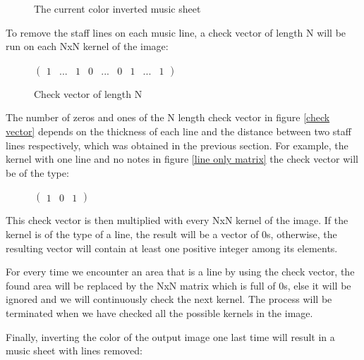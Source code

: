 \documentclass[final]{cvpr}
\begin{document}
\begin{figure}[h]
    \caption{The current color inverted music sheet}
    \label{}
\end{figure}
 
To remove the staff lines on each music line, a check vector of length N will be run 
on each NxN kernel of the image:

\begin{figure}[ht]
    \centering
$
\begin{pmatrix}
	1 & ... & 1 & 0 & ... & 0 & 1 & ... & 1
\end{pmatrix}
$\\
\caption{Check vector of length N}
\label{check vector}
\end{figure}

The number of zeros and ones of the N length check vector in figure \ref{check
vector} depends on the thickness of each line and the distance between two staff
lines respectively, which was obtained in the previous section.  For example,
the kernel with one line and no notes in figure \ref{line only matrix} the
check vector will be of the type:

\begin{figure}[h!]
    \centering
    $
    \begin{pmatrix}
       1 & 0 & 1 
    \end{pmatrix}
    $\\
\end{figure}

 This check vector is then multiplied with every NxN kernel of the image. If the
 kernel is of the type of a line, the result will be a vector of 0s, otherwise,
 the resulting vector will contain at least one positive integer among its
 elements.

 For every time we encounter an area that is a line by using the check vector,
 the found area will be replaced by the NxN matrix which is full of 0s, else it
 will be ignored and we will continuously check the next kernel. The process
 will be terminated when we have checked all the possible kernels in the
 image.

Finally, inverting the color of the output image one last time will result in a
music sheet with lines removed:
\end{document}
